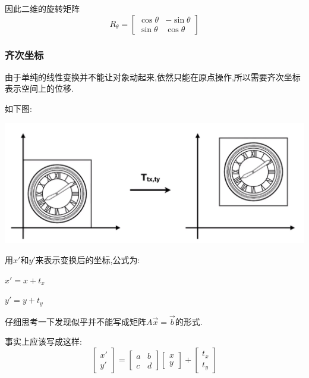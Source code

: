 \documentclass[UTF8,12pt]{ctexbook}
\begin{document}
{{{{      因此二维的旋转矩阵$$
        R_\theta = \begin{bmatrix}
          \cos\theta & -\sin\theta \\
          \sin\theta & \cos\theta
        \end{bmatrix}
      $$


      \subsubsection{齐次坐标}{
        由于单纯的线性变换并不能让对象动起来,依然只能在原点操作,所以需要齐次坐标表示空间上的位移.

        如下图:

        \includegraphics[scale=0.25]{resources/homogeneous_coordinates.png}

        用$x\prime$和$y\prime$来表示变换后的坐标,公式为:

        $x\prime = x + t_x$

        $y\prime = y + t_y$

        仔细思考一下发现似乎并不能写成矩阵$A\vec{x} = \vec{b}$的形式.

        事实上应该写成这样:
        $$
          \begin{bmatrix}
            x\prime \\
            y\prime
          \end{bmatrix}
          =
          \begin{bmatrix}
            a & b \\
            c & d
          \end{bmatrix}
          \begin{bmatrix}
            x \\
            y
          \end{bmatrix}
          +
          \begin{bmatrix}
            t_x \\
            t_y
          \end{bmatrix}
        $$

}}}}}
\end{document}
